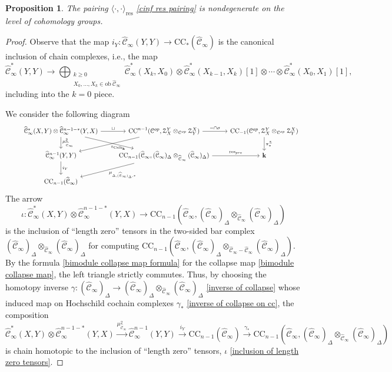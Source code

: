 \documentclass[11pt]{amsproc}
\def\K{{\mathbf{k}}}
\def\cZ{\mathcal{Z}}
\def\cc{\mathcal{C}}
\def\r#1{\mathrm{#1}}
\def\D{\Delta}
\def\ob{\mathrm{ob\ }}
\def\calk{\mathrm{Calk}}
\def\cinf{\widehat{\cc}_{\infty}}
\newtheorem{prop}[lem]{Proposition}
\theoremstyle{remark}
\numberwithin{equation}{section}
\begin{document}
\begin{prop}\label{prop: res pairing nondegenerate}
The pairing $\langle \cdot, \cdot \rangle_{\r{res}}$ \eqref{cinf res pairing} is nondegenerate on the level of cohomology groups.
\end{prop}
\begin{proof}
Observe that the map $i_{Y}: \cinf(Y, Y) \to \r{CC}_{*}(\cinf)$ is the canonical inclusion of chain complexes, i.e., 
the map
\begin{equation}
\cinf^{*}(Y, Y) \to \bigoplus_{\substack{k \ge 0\\X_{0}, \ldots, X_{k} \in \ob \cinf}} \cinf^{*}(X_{k}, X_{0}) \otimes \cinf^{*}(X_{k-1}, X_{k})[1] \otimes \cdots \otimes \cinf^{*}(X_{0}, X_{1})[1],
\end{equation}
including into the $k=0$ piece.

We consider the following diagram
\begin{equation}\label{cd for pairing}
\begin{tikzcd}
& \cinf^{*}(X, Y) \otimes \cinf^{n-1-*}(Y, X) \arrow[r, "\sqcup"] \arrow[d, "\mu_{\cinf}^{2}"] \arrow[rd]  & \r{CC}^{n-1}(\cc^{op}, \cZ_{X}^{Y} \otimes_{\cc^{op}} \cZ_{Y}^{X}) \arrow[r, "- \cap \sigma"] \arrow[ld, "\circ_{\calk_{\K}}"] & \r{CC}_{-1}(\cc^{op}, \cZ_{X}^{Y} \otimes_{\cc^{op}} \cZ_{Y}^{X}) \arrow[d, "\pi^{\cZ}_{*}"] \\
& \cinf^{n-1}(Y, Y) \arrow[d, "i_{Y}"] & \r{CC}_{n-1}(\cinf, (\cinf)_{\D} \otimes_{\cinf} (\cinf)_{\D}) \arrow[r, "\r{res}_{pre}"] \arrow[ld, "\mu_{{\D}, (\cinf)_{\D}, *}"] &\K \\
& \r{CC}_{n-1}(\cinf)
 \end{tikzcd}
\end{equation}
The arrow 
\begin{equation}\label{inclusion of length zero tensors}
\iota: \cinf^{*}(X, Y) \otimes \cinf^{n-1-*}(Y, X) \to \r{CC}_{n-1}(\cinf, (\cinf)_{\D} \otimes_{\cinf} (\cinf)_{\D})
\end{equation}
 is the inclusion of ``length zero'' tensors in the two-sided bar complex $(\cinf)_{\D} \otimes_{\cinf} (\cinf)_{\D}$ for computing $\r{CC}_{n-1}(\cinf, (\cinf)_{\D} \otimes_{\cinf - \cinf} (\cinf)_{\D})$.
By the formula \eqref{bimodule collapse map formula} for the collapse map \eqref{bimodule collapse map},
the left triangle strictly commutes. 
Thus, by choosing the homotopy inverse $\gamma: (\cinf)_{\D} \to (\cinf)_{\D} \otimes_{\cinf} (\cinf)_{\D}$ \eqref{inverse of collapse} whose induced map on Hochschild cochain complexes $\gamma_{*}$ \eqref{inverse of collapse on cc},
the composition
\begin{equation}\label{mu2 to cc diagonal}
\cinf^{*}(X, Y) \otimes \cinf^{n-1-*}(Y, X) \stackrel{\mu_{\cinf}^{2}}\to \cinf^{n-1}(Y, Y) \stackrel{i_{Y}}\to \r{CC}_{n-1}(\cinf) \stackrel{\gamma_{*}}\to \r{CC}_{n-1}(\cinf, (\cinf)_{\D} \otimes_{\cinf} (\cinf)_{\D})
\end{equation}
is chain homotopic to the inclusion of ``length zero'' tensors, $\iota$ \eqref{inclusion of length zero tensors}.



\end{proof}
\end{document}
